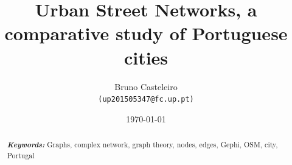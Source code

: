 \documentclass{article}
\providecommand{\keywords}[1]{\textbf{\textit{Keywords:}} #1}
\begin{document}
%
%

\title{Urban Street Networks, a comparative study of Portuguese cities}
%
\author{Bruno Casteleiro\\
	{\texttt{(up201505347@fc.up.pt)}}\\
}

\date{\today}

\maketitle



\begin{abstract}
\vspace{3mm}
\keywords{Graphs, complex network, graph theory, nodes, edges, Gephi, OSM, city, Portugal}
\vspace{5mm}
\end{abstract}

\end{document}
